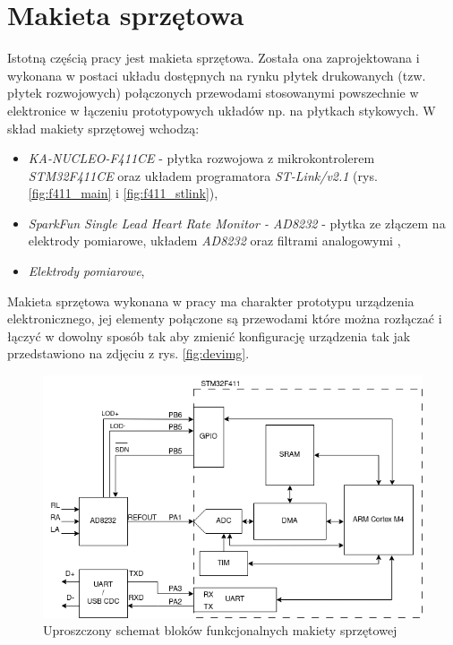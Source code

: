 
\chapter{Makieta sprzętowa}

Istotną częścią pracy jest makieta sprzętowa. Została ona zaprojektowana i wykonana w postaci układu dostępnych na rynku płytek drukowanych
(tzw. płytek rozwojowych) połączonych przewodami stosowanymi powszechnie w elektronice w łączeniu prototypowych układów np. na płytkach stykowych. 
W skład makiety sprzętowej wchodzą:

\begin{itemize}

    \item \textit{KA-NUCLEO-F411CE} - płytka rozwojowa z mikrokontrolerem \textit{STM32F411CE} oraz układem programatora \textit{ST-Link/v2.1} \cite{NUCLEO} (rys. \ref{fig:f411_main} i \ref{fig:f411_stlink}),

    \item \textit{SparkFun Single Lead Heart Rate Monitor - AD8232} - płytka ze złączem na elektrody pomiarowe, układem \textit{AD8232} oraz filtrami analogowymi \cite{AD8232BS},

    \item \textit{Elektrody pomiarowe},

\end{itemize}

Makieta sprzętowa wykonana w pracy ma charakter prototypu urządzenia elektronicznego, 
jej elementy połączone są przewodami które można rozłączać i łączyć w dowolny sposób tak aby zmienić konfigurację urządzenia
tak jak przedstawiono na zdjęciu z rys. \ref{fig:devimg}.

\begin{figure}[h!]
    \centering 
    \includegraphics[scale=0.7]{pl/media/hw_blocks_simplified.png}
    \caption{Uproszczony schemat bloków funkcjonalnych makiety sprzętowej}
    \label{fig:hw_hl}
\end{figure}

